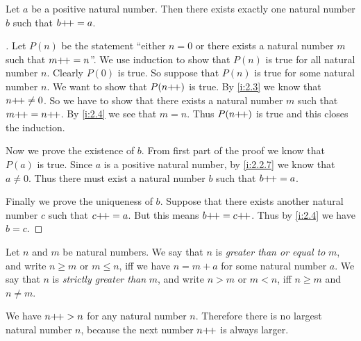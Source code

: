 \begin{lem}\label{i:2.2.10}
  Let \(a\) be a positive natural number.
  Then there exists exactly one natural number \(b\) such that \(b{+}\!{+} = a\).
\end{lem}

\begin{proof}[]
  Let \(P(n)\) be the statement ``either \(n = 0\) or there exists a natural number \(m\) such that \(m{+}\!{+} = n\)''.
  We use induction to show that \(P(n)\) is true for all natural number \(n\).
  Clearly \(P(0)\) is true.
  So suppose that \(P(n)\) is true for some natural number \(n\).
  We want to show that \(P(n{+}\!{+})\) is true.
  By \cref{i:2.3} we know that \(n{+}\!{+} \neq 0\).
  So we have to show that there exists a natural number \(m\) such that \(m{+}\!{+} = n{+}\!{+}\).
  By \cref{i:2.4} we see that \(m = n\).
  Thus \(P(n{+}\!{+})\) is true and this closes the induction.

  Now we prove the existence of \(b\).
  From first part of the proof we know that \(P(a)\) is true.
  Since \(a\) is a positive natural number, by \cref{i:2.2.7} we know that \(a \neq 0\).
  Thus there must exist a natural number \(b\) such that \(b{+}\!{+} = a\).

  Finally we prove the uniqueness of \(b\).
  Suppose that there exists another natural number \(c\) such that \(c{+}\!{+} = a\).
  But this means \(b{+}\!{+} = c{+}\!{+}\).
  Thus by \cref{i:2.4} we have \(b = c\).
\end{proof}

\begin{defn}\label{i:2.2.11}
  Let \(n\) and \(m\) be natural numbers.
  We say that \(n\) is \emph{greater than or equal to} \(m\), and write \(n \geq m\) or \(m \leq n\), iff we have \(n = m + a\) for some natural number \(a\).
  We say that \(n\) is \emph{strictly greater than} \(m\), and write \(n > m\) or \(m < n\), iff \(n \geq m\) and \(n \neq m\).
\end{defn}

\begin{ac}\label{i:ac:2.2.3}
  We have \(n{+}\!{+} > n\) for any natural number \(n\).
  Therefore there is no largest natural number \(n\), because the next number \(n{+}\!{+}\) is always larger.
\end{ac}

